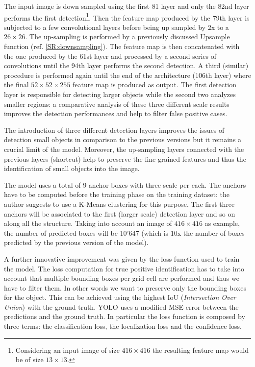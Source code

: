 \documentclass{standalone}
\begin{document}
The input image is down sampled using the first 81 layer and only the 82nd layer performs the first detection\footnote{
  Considering an input image of size $416\times416$ the resulting feature map would be of size $13\times13$.
}.
Then the feature map produced by the 79th layer is subjected to a few convolutional layers before being up sampled by 2x to a $26\times26$.
The up-sampling is performed by a previously discussed Upsample function (ref. \ref{SR:downsampling}).
The feature map is then concatenated with the one produced by the 61st layer and processed by a second series of convolutions until the 94th layer performs the second detection.
A third (similar) procedure is performed again until the end of the architecture (106th layer) where the final $52\times52\times255$ feature map is produced as output.
The first detection layer is responsible for detecting larger objects while the second two analyzes smaller regions: a comparative analysis of these three different scale results improves the detection performances and help to filter false positive cases.

The introduction of three different detection layers improves the issues of detection small objects in comparison to the previous versions but it remains a crucial limit of the model.
Moreover, the up-sampling layers connected with the previous layers (shortcut) help to preserve the fine grained features and thus the identification of small objects into the image.

The model uses a total of 9 anchor boxes with three scale per each.
The anchors have to be computed before the training phase on the training dataset: the author suggests to use a K-Means clustering for this purpose.
The first three anchors will be associated to the first (larger scale) detection layer and so on along all the structure.
Taking into account an image of $416\times416$ as example, the number of predicted boxes will be 10'647 (which is 10x the number of boxes predicted by the previous version of the model).

A further innovative improvement was given by the loss function used to train the model.
The loss computation for true positive identification has to take into account that multiple bounding boxes per grid cell are performed and thus we have to filter them.
In other words we want to preserve only the bounding boxes  for the object.
This can be achieved using the highest IoU (\emph{Intersection Over Union}) with the ground truth.
YOLO uses a modified MSE error between the predictions and the ground truth.
In particular the loss function is composed by three terms: the classification loss, the localization loss and the confidence loss.
\end{document}
